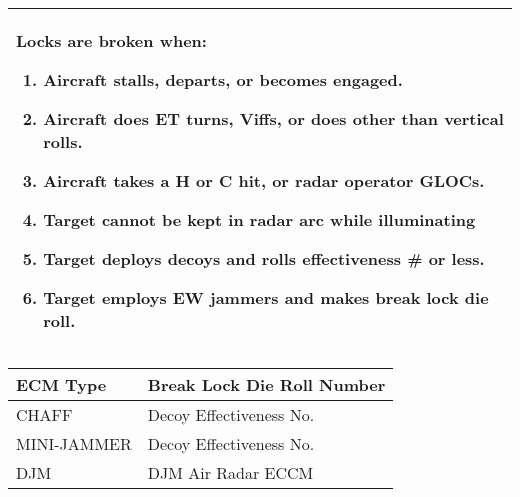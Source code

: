 \begin{onecolumntablefloat}
\begin{onecolumntable}
\begin{tabularx}{\linewidth}{X}
\toprule
\addlinespace
Locks are broken when:

\begin{enumerate}
    \item Aircraft stalls, departs, or becomes engaged.
    \item Aircraft does ET turns, Viffs, or does other than vertical rolls.
    \item Aircraft takes a H or C hit, or radar operator GLOCs.
    \item Target cannot be kept in radar arc while illuminating
    \item Target deploys decoys and rolls effectiveness \# or less.
    \item Target employs EW jammers and makes break lock die roll.
\end{enumerate}
\\
\bottomrule
\end{tabularx}
\end{onecolumntable}
\end{onecolumntablefloat}



\begin{onecolumntablefloat}
\begin{onecolumntable}
\begin{tabular}{lp{15em}}
\toprule
ECM Type&Break Lock Die Roll Number\\
\midrule
CHAFF&Decoy Effectiveness No.\\
MINI-JAMMER&Decoy Effectiveness No.\\
DJM&DJM \minus{} Air Radar ECCM\\
\bottomrule
\end{tabular}
\end{onecolumntable}
\end{onecolumntablefloat}



